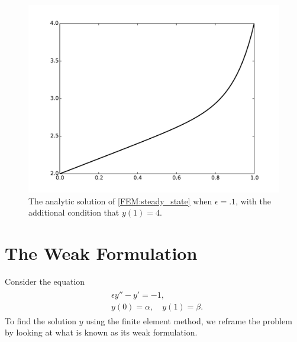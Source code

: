 \begin{figure}[ht]
\centering
\includegraphics[width=\textwidth]{FEM_solution.pdf}
\caption{The analytic solution of \eqref{FEM:steady_state} when $\epsilon = .1$, with the additional condition that $y(1) = 4$.}
\label{FEM:analytic_solution}
\end{figure}


\section*{The Weak Formulation}
Consider the equation
\begin{align}
	\begin{split}
	&{ }\epsilon y'' - y' = -1,\\
	&{ }y(0) = \alpha, \quad y(1) = \beta . 
	\end{split}\label{FEM:eqn1}
\end{align}
To find the solution $y$ using the finite element method, we reframe the problem by looking at what is known as its weak formulation. 

